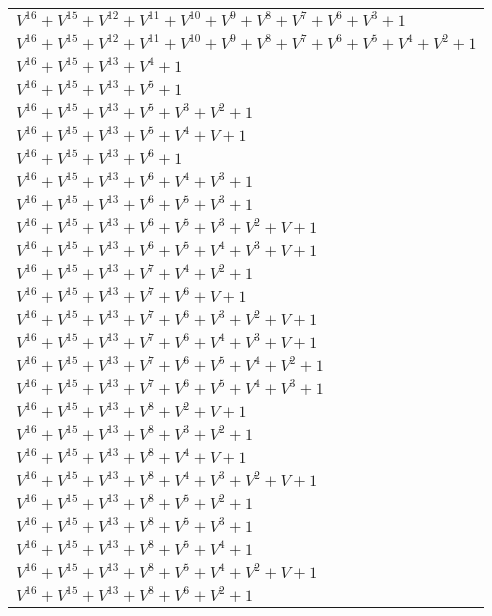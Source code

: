 \documentclass[12pt]{article}
\begin{document}
\begin{adjustwidth}{-4cm}{}
\begin{center}
\begin{longtable}{|l|}
$V^{16}  +V^{15}  +V^{12}  +V^{11}  +V^{10}  +V^{9}  +V^{8}  +V^{7}  +V^{6}  +V^{3}  + 1$ \\
$V^{16}  +V^{15}  +V^{12}  +V^{11}  +V^{10}  +V^{9}  +V^{8}  +V^{7}  +V^{6}  +V^{5}  +V^{4}  +V^{2}  + 1$ \\
$V^{16}  +V^{15}  +V^{13}  +V^{4}  + 1$ \\
$V^{16}  +V^{15}  +V^{13}  +V^{5}  + 1$ \\
$V^{16}  +V^{15}  +V^{13}  +V^{5}  +V^{3}  +V^{2}  + 1$ \\
$V^{16}  +V^{15}  +V^{13}  +V^{5}  +V^{4}  + V + 1$ \\
$V^{16}  +V^{15}  +V^{13}  +V^{6}  + 1$ \\
$V^{16}  +V^{15}  +V^{13}  +V^{6}  +V^{4}  +V^{3}  + 1$ \\
$V^{16}  +V^{15}  +V^{13}  +V^{6}  +V^{5}  +V^{3}  + 1$ \\
$V^{16}  +V^{15}  +V^{13}  +V^{6}  +V^{5}  +V^{3}  +V^{2}  + V + 1$ \\
$V^{16}  +V^{15}  +V^{13}  +V^{6}  +V^{5}  +V^{4}  +V^{3}  + V + 1$ \\
$V^{16}  +V^{15}  +V^{13}  +V^{7}  +V^{4}  +V^{2}  + 1$ \\
$V^{16}  +V^{15}  +V^{13}  +V^{7}  +V^{6}  + V + 1$ \\
$V^{16}  +V^{15}  +V^{13}  +V^{7}  +V^{6}  +V^{3}  +V^{2}  + V + 1$ \\
$V^{16}  +V^{15}  +V^{13}  +V^{7}  +V^{6}  +V^{4}  +V^{3}  + V + 1$ \\
$V^{16}  +V^{15}  +V^{13}  +V^{7}  +V^{6}  +V^{5}  +V^{4}  +V^{2}  + 1$ \\
$V^{16}  +V^{15}  +V^{13}  +V^{7}  +V^{6}  +V^{5}  +V^{4}  +V^{3}  + 1$ \\
$V^{16}  +V^{15}  +V^{13}  +V^{8}  +V^{2}  + V + 1$ \\
$V^{16}  +V^{15}  +V^{13}  +V^{8}  +V^{3}  +V^{2}  + 1$ \\
$V^{16}  +V^{15}  +V^{13}  +V^{8}  +V^{4}  + V + 1$ \\
$V^{16}  +V^{15}  +V^{13}  +V^{8}  +V^{4}  +V^{3}  +V^{2}  + V + 1$ \\
$V^{16}  +V^{15}  +V^{13}  +V^{8}  +V^{5}  +V^{2}  + 1$ \\
$V^{16}  +V^{15}  +V^{13}  +V^{8}  +V^{5}  +V^{3}  + 1$ \\
$V^{16}  +V^{15}  +V^{13}  +V^{8}  +V^{5}  +V^{4}  + 1$ \\
$V^{16}  +V^{15}  +V^{13}  +V^{8}  +V^{5}  +V^{4}  +V^{2}  + V + 1$ \\
$V^{16}  +V^{15}  +V^{13}  +V^{8}  +V^{6}  +V^{2}  + 1$ \\

\end{longtable}
\end{center}
\end{adjustwidth}
\end{document}
